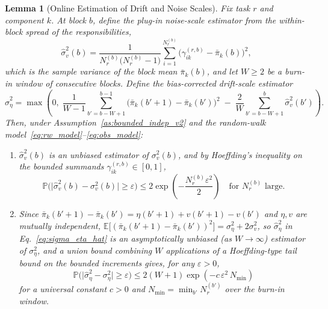 ﻿\documentclass[12pt,a4paper]{article}
\newtheorem{lemma}{Lemma}
\newcommand{\E}{\mathbb{E}}
\newcommand{\Prob}{\mathbb{P}}
\begin{document}
\begin{lemma}[Online Estimation of Drift and Noise Scales]
	\label{lem:online_scales}
	Fix task $r$ and component $k$. At block $b$, define the plug-in
	noise-scale estimator from the within-block spread of the responsibilities,
	\begin{equation}
		\hat\sigma_v^2(b) = \frac{1}{N_r^{(b)}\big(N_r^{(b)}-1\big)}
		\sum_{i=1}^{N_r^{(b)}} \Big(\gamma_{ik}^{(r,b)}-\bar\pi_k(b)\Big)^2,
		\label{eq:sigma_v_hat}
	\end{equation}
	which is the sample variance of the block mean $\bar\pi_k(b)$, and let
	$W\ge2$ be a burn-in window of consecutive blocks. Define the bias-corrected
	drift-scale estimator
	\begin{equation}
		\hat\sigma_\eta^2 = \max\!\left(0,\;
		\frac{1}{W-1}\sum_{b'=b-W+1}^{b-1}
		\big(\bar\pi_k(b'+1)-\bar\pi_k(b')\big)^2
		\;-\;\frac{2}{W}\sum_{b'=b-W+1}^{b}\hat\sigma_v^2(b')
		\right).
		\label{eq:sigma_eta_hat}
	\end{equation}
	Then, under Assumption~\ref{as:bounded_indep_v2} and the random-walk
	model~\eqref{eq:rw_model}--\eqref{eq:obs_model}:
	\begin{enumerate}
		\item[(i)] $\hat\sigma_v^2(b)$ is an unbiased estimator of
		$\sigma_v^2(b)$, and by Hoeffding's inequality on the bounded
		summands $\gamma_{ik}^{(r,b)}\in[0,1]$,
		\begin{equation}
			\Prob\Big(\big|\hat\sigma_v^2(b)-\sigma_v^2(b)\big|\geq\varepsilon\Big)
			\leq 2\exp\!\left(-\frac{N_r^{(b)}\varepsilon^2}{2}\right)\quad\text{for } N_r^{(b)}\text{ large.}
			\label{eq:sigma_v_conc}
		\end{equation}
		\item[(ii)] Since $\bar\pi_k(b'+1)-\bar\pi_k(b')=\eta(b'+1)+v(b'+1)-v(b')$
		and $\eta,v$ are mutually independent, $\E\big[(\bar\pi_k(b'+1)-\bar\pi_k(b'))^2\big]=\sigma_\eta^2+2\sigma_v^2$, so
		$\hat\sigma_\eta^2$ in Eq.~\eqref{eq:sigma_eta_hat} is an asymptotically
		unbiased (as $W\to\infty$) estimator of $\sigma_\eta^2$, and a union
		bound combining $W$ applications of a Hoeffding-type tail bound on
		the bounded increments gives, for any $\varepsilon>0$,
		\begin{equation}
			\Prob\Big(\big|\hat\sigma_\eta^2-\sigma_\eta^2\big|\geq\varepsilon\Big)
			\leq 2(W+1)\exp\!\left(-c\,\varepsilon^2\, N_{\min}\right)
			\label{eq:sigma_eta_conc}
		\end{equation}
		for a universal constant $c>0$ and $N_{\min}=\min_{b'} N_r^{(b')}$
		over the burn-in window.
	\end{enumerate}
\end{lemma}
\end{document}
